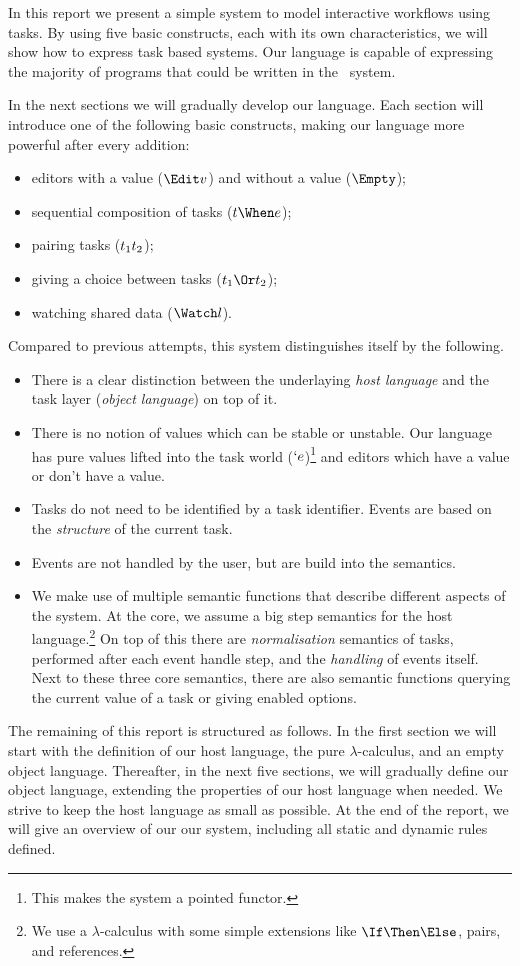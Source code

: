 
In this report we present a simple system to model interactive workflows using tasks.
By using five basic constructs,
each with its own characteristics,
we will show how to express task based systems.
Our language is capable of expressing the majority of programs that could be written in the \ITASKS\ system.

In the next sections we will gradually develop our language.
Each section will introduce one of the following basic constructs,
making our language more powerful after every addition:
\begin{itemize}
  \item editors with a value ($\Edit v$) and without a value ($\Empty$);
  \item sequential composition of tasks ($t \When e$);
  \item pairing tasks ($t_1 \relax t_2$);
  \item giving a choice between tasks ($t_1 \Or t_2$);
  \item watching shared data ($\Watch l$).
\end{itemize}

Compared to previous attempts,
this system distinguishes itself by the following.
\begin{itemize}
  \item
    There is a clear distinction between the underlaying \emph{host language} and the task layer (\emph{object language}) on top of it.
  \item
    There is no notion of values which can be stable or unstable.
    Our language has pure values lifted into the task world ($`e$)\footnote{
      This makes the system a pointed functor.}
    and editors which have a value or don't have a value.
  \item
    Tasks do not need to be identified by a task identifier.
    Events are based on the \emph{structure} of the current task.
  \item
    Events are not handled by the user, but are build into the semantics.
  \item
    We make use of multiple semantic functions that describe different aspects of the system.
    At the core, we assume a big step semantics for the host language.\footnote{
      We use a $\lambda$-calculus with some simple extensions like $\If\Then\Else$, pairs, and references.}
    On top of this there are \emph{normalisation} semantics of tasks,
    performed after each event handle step,
    and the \emph{handling} of events itself.
    Next to these three core semantics,
    there are also semantic functions querying the current value of a task
    or giving enabled options.
\end{itemize}

The remaining of this report is structured as follows.
In the first section we will start with the definition of our host language,
the pure $\lambda$-calculus,
and an empty object language.
Thereafter, in the next five sections, we will gradually define our object language,
extending the properties of our host language when needed.
We strive to keep the host language as small as possible.
At the end of the report,
we will give an overview of our our system,
including all static and dynamic rules defined.

